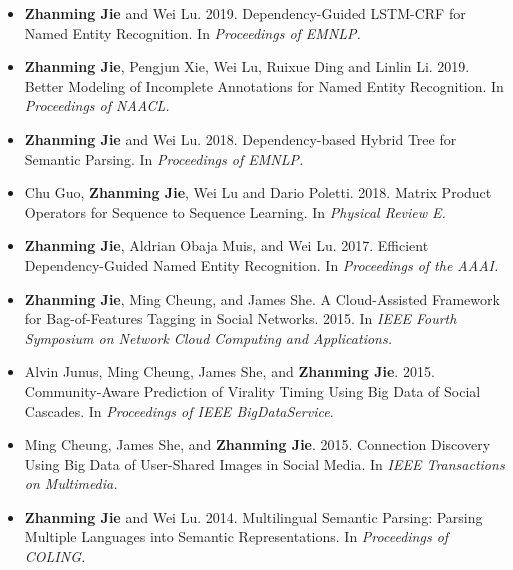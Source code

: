 \documentclass[
11pt, %
oneside, %
english, %
singlespacing, %
headsepline, %
]{MastersDoctoralThesis} %
\begin{document}

\begin{publications}
\addchaptertocentry{\publicationsname} %

\begin{itemize}
	\item \textbf{Zhanming Jie} and Wei Lu. 2019. Dependency-Guided LSTM-CRF for Named Entity Recognition. In \textit{Proceedings of EMNLP.}
	\item \textbf{Zhanming Jie}, Pengjun Xie, Wei Lu, Ruixue Ding and Linlin Li. 2019. Better Modeling of Incomplete Annotations for Named Entity Recognition. In \textit{Proceedings of NAACL.}
	\item \textbf{Zhanming Jie} and Wei Lu. 2018. Dependency-based Hybrid Tree for Semantic Parsing. In \textit{Proceedings of EMNLP.}
	\item Chu Guo, \textbf{Zhanming Jie}, Wei Lu and Dario Poletti. 2018. Matrix Product Operators for Sequence to Sequence Learning. In \textit{Physical Review E.}
	\item \textbf{Zhanming Jie}, Aldrian Obaja Muis, and Wei Lu. 2017. Efficient Dependency-Guided Named Entity Recognition. In \textit{Proceedings of the AAAI.}
	\item \textbf{Zhanming Jie}, Ming Cheung, and James She. A Cloud-Assisted Framework for Bag-of-Features Tagging in Social Networks. 2015. In \textit{IEEE Fourth Symposium on Network Cloud Computing and Applications.}
	\item Alvin Junus, Ming Cheung, James She, and \textbf{Zhanming Jie}. 2015. Community-Aware Prediction of Virality Timing Using Big Data of Social Cascades. In \textit{Proceedings of IEEE BigDataService.}
	\item Ming Cheung, James She, and \textbf{Zhanming Jie}. 2015. Connection Discovery Using Big Data of User-Shared Images in Social Media. In \textit{IEEE Transactions on Multimedia.}
	\item \textbf{Zhanming Jie} and Wei Lu. 2014. Multilingual Semantic Parsing: Parsing Multiple Languages into Semantic Representations. In \textit{Proceedings of COLING.}
\end{itemize}

\end{publications}

\end{document}
